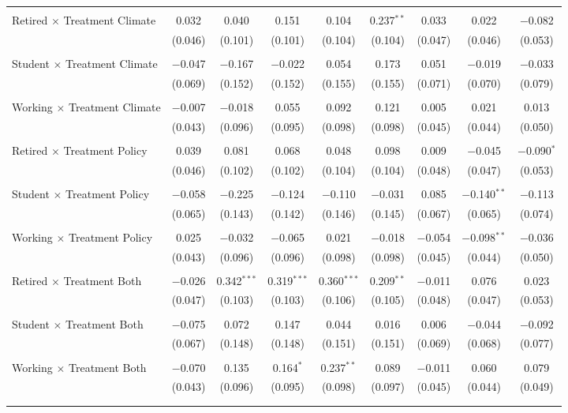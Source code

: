 \begin{tabular}{@{\extracolsep{5pt}}lcccccccc}
  & & & & & & & & \\ 
 Retired $\times$ Treatment Climate & 0.032 & 0.040 & 0.151 & 0.104 & 0.237$^{**}$ & 0.033 & 0.022 & $-$0.082 \\ 
  & (0.046) & (0.101) & (0.101) & (0.104) & (0.104) & (0.047) & (0.046) & (0.053) \\ 
  & & & & & & & & \\ 
 Student $\times$ Treatment Climate & $-$0.047 & $-$0.167 & $-$0.022 & 0.054 & 0.173 & 0.051 & $-$0.019 & $-$0.033 \\ 
  & (0.069) & (0.152) & (0.152) & (0.155) & (0.155) & (0.071) & (0.070) & (0.079) \\ 
  & & & & & & & & \\ 
 Working $\times$ Treatment Climate & $-$0.007 & $-$0.018 & 0.055 & 0.092 & 0.121 & 0.005 & 0.021 & 0.013 \\ 
  & (0.043) & (0.096) & (0.095) & (0.098) & (0.098) & (0.045) & (0.044) & (0.050) \\ 
  & & & & & & & & \\ 
 Retired $\times$ Treatment Policy & 0.039 & 0.081 & 0.068 & 0.048 & 0.098 & 0.009 & $-$0.045 & $-$0.090$^{*}$ \\ 
  & (0.046) & (0.102) & (0.102) & (0.104) & (0.104) & (0.048) & (0.047) & (0.053) \\ 
  & & & & & & & & \\ 
 Student $\times$ Treatment Policy & $-$0.058 & $-$0.225 & $-$0.124 & $-$0.110 & $-$0.031 & 0.085 & $-$0.140$^{**}$ & $-$0.113 \\ 
  & (0.065) & (0.143) & (0.142) & (0.146) & (0.145) & (0.067) & (0.065) & (0.074) \\ 
  & & & & & & & & \\ 
 Working $\times$ Treatment Policy & 0.025 & $-$0.032 & $-$0.065 & 0.021 & $-$0.018 & $-$0.054 & $-$0.098$^{**}$ & $-$0.036 \\ 
  & (0.043) & (0.096) & (0.096) & (0.098) & (0.098) & (0.045) & (0.044) & (0.050) \\ 
  & & & & & & & & \\ 
 Retired $\times$ Treatment Both & $-$0.026 & 0.342$^{***}$ & 0.319$^{***}$ & 0.360$^{***}$ & 0.209$^{**}$ & $-$0.011 & 0.076 & 0.023 \\ 
  & (0.047) & (0.103) & (0.103) & (0.106) & (0.105) & (0.048) & (0.047) & (0.053) \\ 
  & & & & & & & & \\ 
 Student $\times$ Treatment Both & $-$0.075 & 0.072 & 0.147 & 0.044 & 0.016 & 0.006 & $-$0.044 & $-$0.092 \\ 
  & (0.067) & (0.148) & (0.148) & (0.151) & (0.151) & (0.069) & (0.068) & (0.077) \\ 
  & & & & & & & & \\ 
 Working $\times$ Treatment Both & $-$0.070 & 0.135 & 0.164$^{*}$ & 0.237$^{**}$ & 0.089 & $-$0.011 & 0.060 & 0.079 \\ 
  & (0.043) & (0.096) & (0.095) & (0.098) & (0.097) & (0.045) & (0.044) & (0.049) \\ 
  & & & & & & & & \\ 
\hline \\[-1.8ex] 


\end{tabular}
